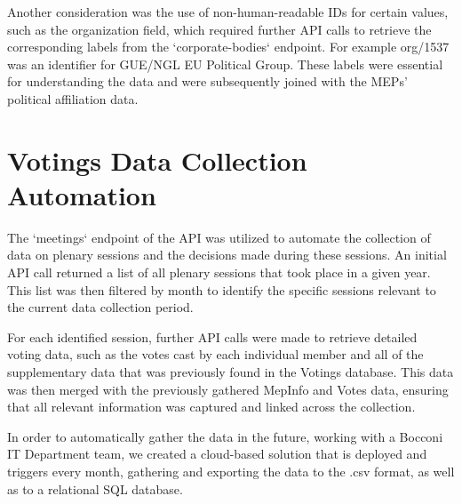 \documentclass[a4paper,12pt]{report}
\begin{document}
            Another consideration was the use of non-human-readable IDs for certain values, such as the organization
            field,
            which required further API calls to retrieve the corresponding labels from the `corporate-bodies` endpoint.
            For
            example org/1537 was an identifier for GUE/NGL EU Political Group. These labels were essential for
            understanding the
            data and were subsequently joined with the MEPs' political affiliation data.


        \section{Votings Data Collection Automation}\label{sec:votings-data-collection-automation}

            The `meetings` endpoint of the API was utilized to automate the collection of data on plenary sessions and
            the
            decisions made during these sessions. An initial API call returned a list of all plenary sessions that took
            place in
            a given year. This list was then filtered by month to identify the specific sessions relevant to the current
            data
            collection period.

            For each identified session, further API calls were made to retrieve detailed voting data, such as the votes
            cast by
            each individual member and all of the supplementary data that was previously found in the Votings database.
            This
            data was then merged with the previously gathered MepInfo and Votes data, ensuring that all relevant
            information was
            captured and linked across the collection.

            In order to automatically gather the data in the future, working with a Bocconi IT Department team, we
            created a
            cloud-based solution that is deployed and triggers every month, gathering and exporting the data to the .csv
            format,
            as well as to a relational SQL database.
\end{document}
